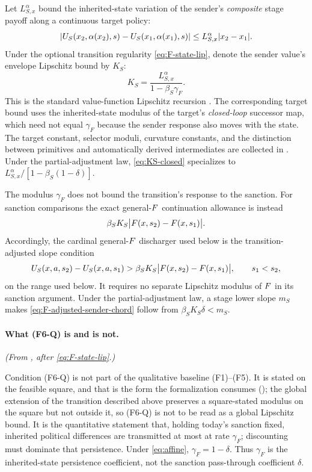 Let $L_{S,x}^{\alpha}$ bound the inherited-state variation of the
sender's \emph{composite} stage payoff along a continuous target policy:
\[
\left|U_S(x_2,\alpha(x_2),s)-U_S(x_1,\alpha(x_1),s)\right|
\le L_{S,x}^{\alpha}|x_2-x_1|.
\]
Under the optional transition regularity \eqref{eq:F-state-lip}, denote
the sender value's envelope Lipschitz bound by $K_S$:
\begin{equation}
K_S=\frac{L_{S,x}^{\alpha}}{1-\beta_S\gamma_F}.
\label{eq:KS-closed}
\end{equation}
This is the standard value-function Lipschitz recursion
\citep{StokeyLucas1989,BertsekasTsitsiklis1996}. The corresponding
target bound uses the inherited-state modulus of the target's
\emph{closed-loop} successor map, which need not equal $\gamma_F$
because the sender response also moves with the state. The target
constant, selector moduli, curvature constants, and the distinction
between primitives and automatically derived intermediates are collected
in . Under the partial-adjustment law,
\eqref{eq:KS-closed} specializes to
$L_{S,x}^{\alpha}/[1-\beta_S(1-\delta)]$.

The modulus $\gamma_F$ does not bound the transition's response to the
sanction. For sanction comparisons the exact general-$F$ continuation
allowance is instead
\begin{equation}
\beta_S K_S\bigl|F(x,s_2)-F(x,s_1)\bigr|.
\label{eq:F-continuation-allowance}
\end{equation}
Accordingly, the cardinal general-$F$ discharger used below is the
transition-adjusted slope condition
\begin{equation}
U_S(x,a,s_2)-U_S(x,a,s_1)
>
\beta_S K_S\bigl|F(x,s_2)-F(x,s_1)\bigr|,
\qquad s_1<s_2,
\end{equation}
on the range used below. It requires no
separate Lipschitz modulus of $F$ in its sanction argument. Under the
partial-adjustment law, a stage lower slope $m_S$ makes
\eqref{eq:F-adjusted-sender-chord} follow from
$\beta_S K_S\delta<m_S$.

\paragraph{What \textup{(F6-Q)} is and is not.} \emph{(From , after \eqref{eq:F-state-lip}.)}

Condition \textup{(F6-Q)} is not part of the qualitative baseline
\textup{(F1)--(F5)}. It is stated on the feasible square, and that is the
form the formalization consumes (); the global extension of the transition described
above preserves a square-stated modulus on the square but not outside it, so
\textup{(F6-Q)} is not to be read as a global Lipschitz bound. It is the quantitative statement that, holding
today's sanction fixed, inherited political differences are transmitted
at most at rate $\gamma_F$; discounting must dominate that persistence.
Under \eqref{eq:affine}, $\gamma_F=1-\delta$. Thus $\gamma_F$ is the
inherited-state persistence coefficient, not the sanction pass-through
coefficient $\delta$.

